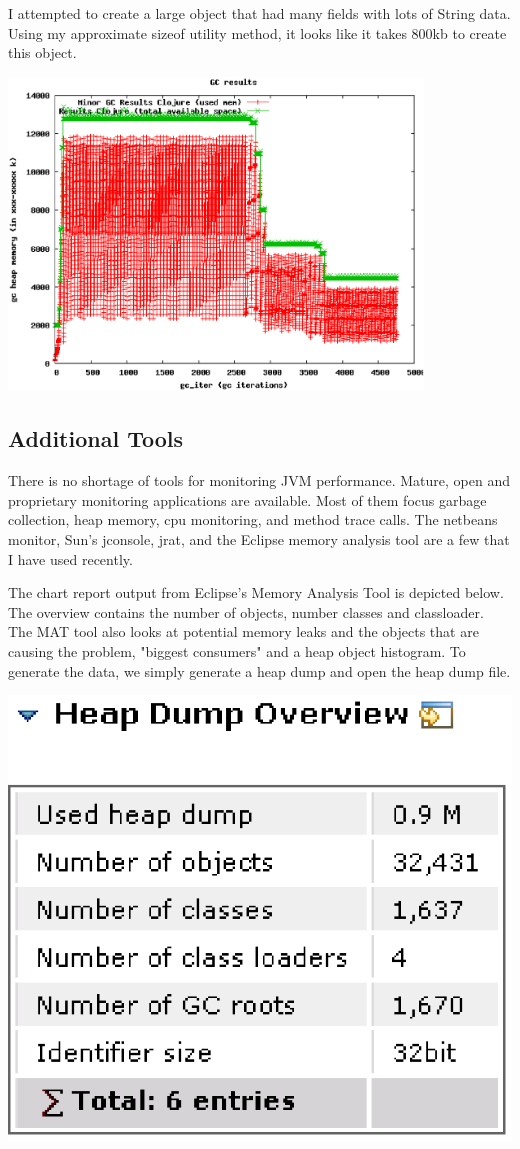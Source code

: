 I attempted to create a large object that had many fields with lots of String data. Using my approximate sizeof utility method, it looks like it takes 800kb to create this object.

\includegraphics[width=110mm]{gc_5_vars_clj_25.eps}

\subsection{Additional Tools}

There is no shortage of tools for monitoring JVM performance. Mature, open and proprietary monitoring applications are available. Most of them focus garbage collection, heap memory, cpu monitoring, and method trace calls. The netbeans monitor, Sun's jconsole, jrat, and the Eclipse memory analysis tool are a few that I have used recently.

The chart report output from Eclipse's Memory Analysis Tool is depicted below. The overview contains the number of objects, number classes and classloader. The MAT tool also looks at potential memory leaks and the objects that are causing the problem, "biggest consumers" and a heap object histogram. To generate the data, we simply generate a heap dump and open the heap dump file.

\includegraphics{hist_clj_30.eps}

